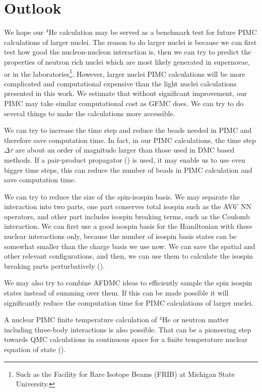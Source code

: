 \documentclass[12pt,letterpaper,UTF8]{report}
\begin{document}
\section{Outlook}

We hope our $^4$He calculation may be served as a benchmark test for future PIMC calculations of larger nuclei.
The reason to do larger nuclei is because we can first test how good the nucleon-nucleon interaction is, then we can try to predict the properties of neutron rich nuclei which are most likely generated in supernovae,
or in the laboratories\footnote{Such as the Facility for Rare Isotope Beams (FRIB) at Michigan State University.}.
However, larger nuclei PIMC calculations will be more complicated and computational expensive than the light nuclei calculations presented in this work.
We estimate that without significant improvement,
our PIMC may take similar computational cost as GFMC does.
We can try to do several things to make the calculations more accessible.

We can try to increase the time step and reduce the beads needed in PIMC and therefore save computation time.
In fact, in our PIMC calculations, the time step $\Delta \tau$ are about an order of magnitude larger than those used in DMC based methods.
If a pair-product propagator (\cite{Ceperley95a,SchmidtLee95a,Pudliner1997PRC,CarlsonRMP15a}) is used, it may enable us to use even bigger time steps, this can reduce the number of beads in PIMC calculation and save computation time.

We can try to reduce the size of the spin-isospin basis.
We may separate the interaction into two parts, one part conserves total isospin such as the AV6' NN operators,
and other part includes isospin breaking terms, such as the Coulomb interaction.
We can first use a good isospin basis for the Hamiltonian with these nuclear interactions only,
because the number of isospin basis states can be somewhat smaller than the charge basis we use now.
We can save the spatial and other relevant configurations,
and then, we can use them to calculate the isospin breaking parts perturbatively (\cite{Lonardoni2018PRC}).

We may also try to combine AFDMC ideas to efficiently sample the spin isospin states instead of summing over them.
If this can be made possible it will significantly reduce the computation time for PIMC calculations of larger nuclei.

A nuclear PIMC finite temperature calculation of $^4$He or neutron matter including three-body interactions is also possible.
That can be a pioneering step towards QMC calculations in continuous space for a finite temperature nuclear equation of state (\cite{LWChen2008a,Chen2010PRC}).
\end{document}
